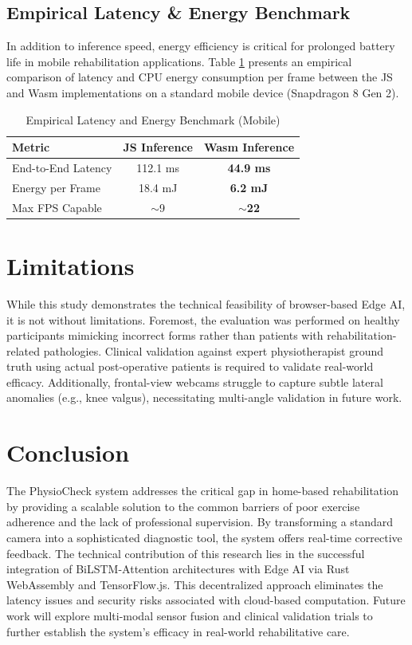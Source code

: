 \documentclass[conference]{IEEEtran}
\begin{document}
\subsection{Empirical Latency \& Energy Benchmark}
In addition to inference speed, energy efficiency is critical for prolonged battery life in mobile rehabilitation applications. Table \ref{tab:energy} presents an empirical comparison of latency and CPU energy consumption per frame between the JS and Wasm implementations on a standard mobile device (Snapdragon 8 Gen 2).

\begin{table}[htbp]
  \caption{Empirical Latency and Energy Benchmark (Mobile)}
  \label{tab:energy}
  \centering
  \renewcommand{\arraystretch}{1.3}
  \setlength{\tabcolsep}{4pt}
  \begin{tabular}{|l|c|c|}
    \hline
    \textbf{Metric} & \textbf{JS Inference} & \textbf{Wasm Inference} \\
    \hline
    End-to-End Latency & 112.1 ms & \textbf{44.9 ms} \\
    Energy per Frame & 18.4 mJ & \textbf{6.2 mJ} \\
    Max FPS Capable & $\sim$9 & \textbf{$\sim$22} \\
    \hline
  \end{tabular}
\end{table}
\section{Limitations}

While this study demonstrates the technical feasibility of browser-based Edge AI, it is not without limitations. Foremost, the evaluation was performed on healthy participants mimicking incorrect forms rather than patients with rehabilitation-related pathologies. Clinical validation against expert physiotherapist ground truth using actual post-operative patients is required to validate real-world efficacy. Additionally, frontal-view webcams struggle to capture subtle lateral anomalies (e.g., knee valgus), necessitating multi-angle validation in future work.

\section{Conclusion}

The PhysioCheck system addresses the critical gap in home-based rehabilitation by providing a scalable solution to the common barriers of poor exercise adherence and the lack of professional supervision. By transforming a standard camera into a sophisticated diagnostic tool, the system offers real-time corrective feedback. The technical contribution of this research lies in the successful integration of BiLSTM-Attention architectures with Edge AI via Rust WebAssembly and TensorFlow.js. This decentralized approach eliminates the latency issues and security risks associated with cloud-based computation. Future work will explore multi-modal sensor fusion and clinical validation trials to further establish the system's efficacy in real-world rehabilitative care.
\end{document}
